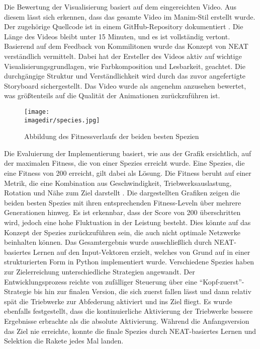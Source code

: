 Die Bewertung der Visualisierung basiert auf dem eingereichten Video. Aus diesem lässt sich erkennen, dass das gesamte Video im Manim-Stil erstellt wurde. Der zugehörige Quellcode ist in einem GitHub-Repository dokumentiert \cite{githubdoc}. Die Länge des Videos bleibt unter 15 Minuten, und es ist vollständig vertont. Basierend auf dem Feedback von Kommilitonen wurde das Konzept von NEAT verständlich vermittelt. Dabei hat der Ersteller des Videos aktiv auf wichtige Visualisierungsgrundlagen, wie Farbkomposition und Lesbarkeit, geachtet. Die durchgängige Struktur und Verständlichkeit wird durch das zuvor angefertigte Storyboard sichergestellt. Das Video wurde als angenehm anzusehen bewertet, was größtenteils auf die Qualität der Animationen zurückzuführen ist.

\begin{figure}[h] %
	\centering %
	\texttt{[image: \\imagedir/species.jpg]} %
	\caption{Abbildung des Fitnessverlaufs der beiden besten Spezien} %
\end{figure}

Die Evaluierung der Implementierung basiert, wie aus der Grafik ersichtlich, auf der maximalen Fitness, die von einer Spezies erreicht wurde. Eine Spezies, die eine Fitness von 200 erreicht, gilt dabei als Lösung. Die Fitness beruht auf einer Metrik, die eine Kombination aus Geschwindigkeit, Triebwerksauslastung, Rotation und Nähe zum Ziel darstellt \cite{gymnasiumdoc}. Die dargestellten Grafiken zeigen die beiden besten Spezies mit ihren entsprechenden Fitness-Leveln über mehrere Generationen hinweg. Es ist erkennbar, dass der Score von 200 überschritten wird, jedoch eine hohe Fluktuation in der Leistung besteht. Dies könnte auf das Konzept der Spezies zurückzuführen sein, die auch nicht optimale Netzwerke beinhalten können. Das Gesamtergebnis wurde ausschließlich durch NEAT-basiertes Lernen auf den Input-Vektoren erzielt, welches von Grund auf in einer strukturierten Form in Python implementiert wurde. Verschiedene Spezies haben zur Zielerreichung unterschiedliche Strategien angewandt. Der Entwicklungsprozess reichte von zufälliger Steuerung über eine \enquote{Kopf-zuerst}-Strategie bis hin zur finalen Version, die sich zuerst fallen lässt und dann relativ spät die Triebwerke zur Abfederung aktiviert und ins Ziel fliegt. Es wurde ebenfalls festgestellt, dass die kontinuierliche Aktivierung der Triebwerke bessere Ergebnisse erbrachte als die absolute Aktivierung. Während die Anfangsversion das Ziel nie erreichte, konnte die finale Spezies durch NEAT-basiertes Lernen und Selektion die Rakete jedes Mal landen.

